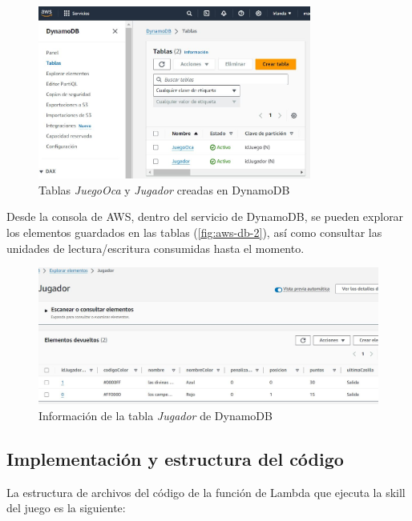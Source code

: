 \begin{figure}[H]
	\centering
	\includegraphics[width=0.8\textwidth]{imgs/aws-db-1.jpg}
	\caption{Tablas \textit{JuegoOca} y \textit{Jugador} creadas en DynamoDB}
	\label{fig:aws-db-1}
\end{figure}

Desde la consola de AWS, dentro del servicio de DynamoDB, se pueden explorar los elementos guardados en las tablas (\autoref{fig:aws-db-2}), así como consultar las unidades de lectura/escritura consumidas hasta el momento.

\begin{figure}[H]
	\centering
	\includegraphics[width=1\textwidth]{imgs/aws-db-2.jpg}
	\caption{Información de la tabla \textit{Jugador} de DynamoDB}
	\label{fig:aws-db-2}
\end{figure}

\subsection{Implementación y estructura del código}

La estructura de archivos del código de la función de Lambda que ejecuta la skill del juego es la siguiente:

